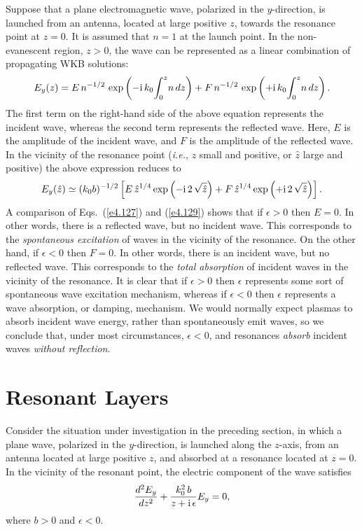 Suppose that a plane electromagnetic wave, polarized in the
$y$-direction,   is launched
from an antenna, located at large positive $z$,  towards the resonance
 point at $z=0$.
It is assumed that $n=1$ at the launch point. 
In the non-evanescent region, $z>0$,  the wave can be
represented as a linear combination
of propagating WKB solutions:
\begin{equation}
E_y(z) = E\, n^{-1/2}\,\exp\left(- {\rm i}\, k_0 \!\int_0^z \!n\,dz\right)
+ F\,n^{-1/2}\,\exp\left(+{\rm i}\, k_0 \!\int_0^z \!n\,dz\right).
\end{equation}
The first term on the right-hand side of the above equation represents the
incident wave, whereas the second term represents the reflected wave. 
Here, $E$ is the amplitude of the incident wave, and $F$ is the amplitude of
the reflected wave.
In the vicinity of the resonance point ({\em i.e.}, $z$ small and positive,
or $\hat{z}$ large and positive)
the above expression reduces to
\begin{equation}\label{e4.129}
E_y(\hat{z}) \simeq  (k_0 b)^{-1/2}\left[
E\,\hat{z}^{1/4}\exp\left(-{\rm i}\,2\,\sqrt{\hat{z}}\right)
+ F\,\hat{z}^{1/4}\exp\left(+{\rm i}\,2\,\sqrt{\hat{z}}\right)\right].
\end{equation}
A comparison of Eqs.~(\ref{e4.127}) and (\ref{e4.129}) shows that if $\epsilon>0$ then
$E=0$. In other words, there is a reflected wave, but no incident wave. 
This corresponds to the  {\em spontaneous  excitation}\/ of  waves in the vicinity of the
resonance. On the other hand, if $\epsilon<0$ then $F=0$. In other words,
there is an incident wave, but no reflected wave. This corresponds to the
{\em total absorption}\/ of incident waves in the vicinity of the resonance. 
It is clear that if $\epsilon>0$ then $\epsilon$ represents some sort of
spontaneous wave excitation mechanism, whereas if $\epsilon<0$ then
$\epsilon$ represents a wave absorption, or damping, mechanism. 
We would normally expect plasmas to absorb incident wave energy, rather
than spontaneously emit waves, so we conclude that, under most circumstances,
$\epsilon<0$, and resonances {\em absorb}\/ incident waves {\em without reflection}.

\section{Resonant Layers}
Consider the situation under investigation in the 
preceding section, in which a plane wave, polarized in the $y$-direction,
is launched along the $z$-axis, from an antenna located at large positive $z$, 
and absorbed at a resonance located at $z=0$. In the vicinity
of the resonant point, the electric component of the wave satisfies
\begin{equation}\label{e4.130}
\frac{d^2 E_y}{dz^2} + \frac{k_0^2\,b}{z+{\rm i}\,\epsilon} E_y = 0,
\end{equation}
where $b>0$ and $\epsilon<0$. 

